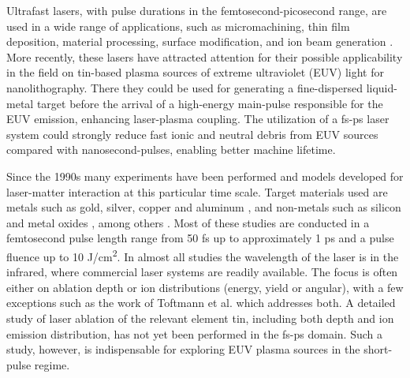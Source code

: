 \documentclass[aip, jap, reprint, amsmath, amssymb]{revtex4-1}
\begin{document}
Ultrafast lasers, with pulse durations in the femtosecond-picosecond range, are used in a wide range of applications, such as micromachining, thin film deposition, material processing, surface modification, and ion beam generation \cite{kruger1999,anisimov1993, chichkov1996, pronko1995, preuss1995, obona2011, kato2008, doring2010, varel1997}. More recently, these lasers have attracted attention for their possible applicability in the field on tin-based plasma sources of extreme ultraviolet (EUV) light for nanolithography. There they could be used for generating a fine-dispersed liquid-metal target\cite{vinokhodov2016} before the arrival of a high-energy main-pulse responsible for the EUV emission, enhancing laser-plasma coupling\cite{sullivan2015}. The utilization of a fs-ps laser system could strongly reduce fast ionic and neutral debris from EUV sources compared with nanosecond-pulses\cite{toftmann2013}, enabling better machine lifetime\cite{banine2011}. 

Since the 1990s many experiments have been performed and models developed\cite{chichkov1996,anisimov1993} for laser-matter interaction at this particular time scale. Target materials used are metals such as gold, silver, copper and aluminum \cite{amoruso2000, amoruso2002, toftmann2013,nolte1997,verhoff2012,furusawa1999, preuss1995, zhang2002, albert2003, yang2006}, and non-metals such as silicon \cite{shaheen2014, hebeisen2008, menendez2010, amoruso2005a} and metal oxides \cite{mero2005, stoian2000, stoian2002}, among others \cite{ditmere1997, claeyssens2002}. Most of these studies are conducted in a femtosecond pulse length range from 50 fs up to approximately 1 ps and a pulse fluence up to 10 J/cm\textsuperscript{2}. In almost all studies the wavelength of the laser is in the infrared, where commercial laser systems are readily available. The focus is often either on ablation depth or ion distributions (energy, yield or angular), with a few exceptions such as the work of Toftmann et al.\cite{toftmann2013} which addresses both. A detailed study of laser ablation of the relevant element tin, including both depth and ion emission distribution, has not yet been performed in the fs-ps domain. Such a study, however, is indispensable for exploring EUV plasma sources in the short-pulse regime.
\end{document}

